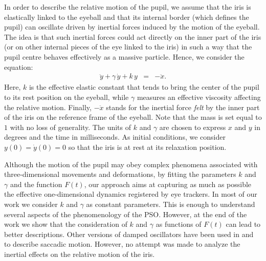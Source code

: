 \documentclass[prl]{revtex4}
\begin{document}
In order to describe the relative motion of the pupil, we assume that the iris is elastically linked to the eyeball and that its internal border (which defines the pupil) can oscillate driven by inertial forces induced by the motion of the eyeball. The idea is that such inertial forces could act directly on the inner part of the iris (or on other internal pieces of the eye linked to the iris) in such a way that the pupil centre behaves effectively as a massive particle. Hence, we consider the equation:
\begin{eqnarray}
\label{ypunto}
\ddot{y}+\gamma\,\dot{y}+k\, y&=&-\ddot{x}.
\end{eqnarray}
Here, $k$ is the effective elastic constant that tends to bring the center of the pupil to its rest position on the eyeball, while $\gamma$ measures an effective viscosity affecting the relative motion. Finally, $-\ddot{x}$ stands for the inertial force {\em felt} by the inner part of the iris on the reference frame of the eyeball. Note that the mass is set equal to $1$ with no loss of generality. The units of $k$ and $\gamma$ are chosen to express $x$ and $y$ in degrees and the time in milliseconds. As initial conditions, we consider $y(0)=\dot{y}(0)=0$ so that the iris is at rest at its relaxation position. 

Although the motion of the pupil may obey complex phenomena associated with three-dimensional movements and deformations, by fitting the parameters $k$ and $\gamma$ and the function $F(t)$, our approach aims at capturing as much as possible the effective one-dimensional dynamics registered by eye trackers. In most of our work we consider $k$ and $\gamma$ as constant parameters. This is enough to understand several aspects of the phenomenology of the PSO. However, at the end of the work we show that the consideration of $k$ and $\gamma$ as functions of $F(t)$ can lead to better descriptions. Other versions of damped oscillators have been used in \cite{Artal:2014} and \cite{gasaneo2017} to describe saccadic motion. However, no attempt was made to analyze the inertial effects on the relative motion of the iris. 
\end{document}
